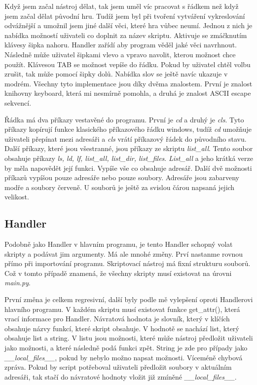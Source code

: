 \documentclass[12pt,a4paper]{article}
\begin{document}
Když jsem začal nástroj dělat, tak jsem uměl víc pracovat s řádkem než když jsem začal dělat původní hru. Tudíž jsem byl při tvoření vytváření vykreslování odvážnější a umožnil jsem jiné další věci, které hra vůbec neumí. Jednou z nich je nabídka možností uživateli co doplnit za název skriptu. Aktivuje se zmáčknutím klávesy šipka nahoru. Handler zařídí aby program věděl jaké věci navrhnout. Následně může uživatel šipkami vlevo a vpravo navolit, kterou možnost chce použít. Klávesou TAB se možnost vepíše do řádku. Pokud by uživatel chtěl volbu zrušit, tak může pomocí šipky dolů. Nabídka slov se ještě navíc ukazuje v modrém. Všechny tyto implementace jsou díky dvěma znalostem. První je znalost knihovny keyboard, která mi nesmírně pomohla, a druhá je znalost ASCII escape sekvencí.

Řádka má dva příkazy vestavěné do programu. První je \textit{cd} a druhý je \textit{cls}. Tyto příkazy kopírují funkce klasického příkazového řádku windows, tudíž \textit{cd} umožňuje uživateli přepínat mezi adresáři a \textit{cls} vrátí příkazový řádek do původního stavu. Další příkazy, které jsou všestranné, jsou příkazy ze skriptu \textit{list\_all}. Tento soubor obsahuje příkazy \textit{ls, ld, lf, list\_all, list\_dir, list\_files}. \textit{List\_all} a jeho krátká verze by měla napovědět její funkci. Vypíše vše co obsahuje adresář. Další dvě možnosti příkazů vypíšou pouze adresáře nebo pouze soubory. Adresáře jsou zabarveny modře a soubory červeně. U souborů je ještě za svislou čárou napsaná jejich velikost.
\subsection{Handler}
Podobně jako Handler v hlavním programu, je tento Handler schopný volat skripty a podávat jim argumenty. Má ale mnohé změny. Prví nastanme rovnou přímo při importování programu. Skriptovací nástroj má fixní strukturu souborů. Což v tomto případě znamená, že všechny skripty musí existovat na úrovni \textit{main.py}. 

První změna je celkem regresivní, další byly podle mě vylepšení oproti Handlerovi hlavního programu. V každém skriptu musí existovat funkce get\_attr(), která vrací informace pro Handler. Návratová hodnota je slovník, který v klíčích obsahuje názvy funkcí, které skript obsahuje. V hodnotě se nachází list, který obsahuje list a string. V listu jsou možnosti, které může nástroj předložit uživateli jako možnosti, a které následně podá funkci zpět. String je zde pro případy jako  \textit{\_\_local\_files\_\_}, pokud by nebylo možno napsat možnosti. Víceméně chybová zpráva. Pokud by script potřeboval uživateli předložit soubory v aktuálním adresáři, tak stačí do návratové hodnoty vložit již zmíněné \textit{\_\_local\_files\_\_}.
\end{document}
